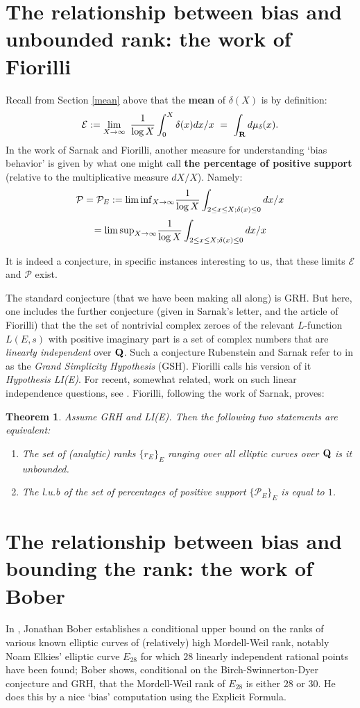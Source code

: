 \documentclass[11pt]{article}
\theoremstyle{plain}
\newtheorem{theorem}{Theorem}[section]
\theoremstyle{definition}
\numberwithin{equation}{section}
\numberwithin{figure}{section}
\numberwithin{table}{section}
\def\Q{\bf{Q}}
\begin{document}
\vskip10pt
\section{The relationship between bias and unbounded rank: the work of Fiorilli}\label{Fi}

  Recall from Section {\ref{mean}} above that the {\bf mean} of $\delta(X)$ is by definition:
$${\mathcal E} : = \lim_{X \to {\infty}}\ {\frac{1}{\log X}}\int_0^X\delta(x)dx/x \ = \ \int_{\bf R}d\mu_\delta(x).$$
In the work of Sarnak and Fiorilli, another measure for understanding `bias behavior' is given by what one might call {\bf the percentage of positive  support} (relative to the multiplicative measure $dX/X$). Namely:
$${\mathcal P} ={\mathcal P}_E:=  \lim {\rm inf}_{X\to \infty}{\frac{1}{\log X}}\int_{2\le x \le X; \delta(x)\le 0}dx/x$$
$$=   \lim {\rm sup}_{X\to \infty}{\frac{1}{\log X}}\int_{2\le x \le X; \delta(x)\le 0}dx/x$$
 \vskip20pt

  It is indeed a conjecture, in specific instances interesting to us, that these limits ${\mathcal E} $ and ${\mathcal P}$  exist.
   \vskip20pt

   The standard conjecture (that we have been making all along) is GRH. But here, one includes the further conjecture (given in Sarnak's letter, and the article of Fiorilli) that the the set of nontrivial complex zeroes of the relevant $L$-function $L(E,s)$ with positive imaginary part  is a set of complex numbers that are {\it linearly independent} over ${\Q}$. Such a conjecture Rubenstein and Sarnak refer to in \cite{R-S} as the {\it Grand Simplicity Hypothesis} (GSH).  Fiorilli calls his version of it  {\it Hypothesis LI(E)}.  For recent, somewhat related, work on such linear independence questions, see \cite{M-N}.   Fiorilli, following the work of Sarnak,  proves:

   \begin{theorem} Assume GRH and LI(E). Then the following two statements are equivalent:
   \begin{enumerate} \item  The set of (analytic) ranks $\{r_E\}_E$ ranging over all elliptic curves over ${\Q}$ is {it unbounded}.
   \item  The  l.u.b of the set of  {\it percentages of positive support}  $\{{\mathcal P}_E\}_E$ is equal to $1$.\end{enumerate}\end{theorem}
\section{The relationship between bias and bounding the rank: the work of Bober}  In \cite{B}, Jonathan Bober  establishes a conditional upper bound on the ranks of various known elliptic curves of (relatively) high Mordell-Weil rank, notably Noam Elkies'  elliptic curve $E_{28}$ for which $28$ linearly independent rational points have been found; Bober shows, conditional on the Birch-Swinnerton-Dyer conjecture and GRH, that the Mordell-Weil rank of $E_{28}$ is either $28$ or $30$. He does this by a nice `bias' computation using the Explicit Formula.
\end{document}
